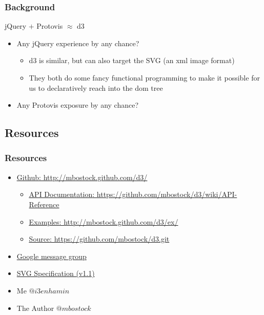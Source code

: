 \documentclass{beamer}
\begin{document}
\begin{frame}
    \frametitle{Background}
    \begin{block}{jQuery $+$ Protovis $\approx$ d3}
\pause
        \begin{itemize}
        \item Any jQuery experience by any chance?
\pause
            \begin{itemize}
            \item d3 is similar, but can also target the SVG (an xml image format)
\pause
            \item They both do some fancy functional programming to make it possible 
                  for us to declaratively reach into the dom tree
            \end{itemize}
\pause
       \item Any Protovis exposure by any chance?
       \end{itemize}
    \end{block}
\end{frame}



\subsection{Resources}

\begin{frame}
    \frametitle{Resources}
\pause
        \begin{itemize}
        \item \href{http://mbostock.github.com/d3/}{\underline{Github}: http://mbostock.github.com/d3/}
\pause
            \begin{itemize}
            \item \href{https://github.com/mbostock/d3/wiki/API-Reference}{\underline{API Documentation}: https://github.com/mbostock/d3/wiki/API-Reference}
\pause
            \item \href{http://mbostock.github.com/d3/ex/}{\underline{Examples}: http://mbostock.github.com/d3/ex/}
\pause
            \item \href{https://github.com/mbostock/d3.git}{\underline{Source}: https://github.com/mbostock/d3.git}
            \end{itemize}
\pause
        \item \href{http://groups.google.com/group/d3-js?pli=1}{Google message group}
\pause
        \item \href{http://www.w3.org/TR/SVG/}{SVG Specification (v1.1)}
\pause
        \item Me $@i3enhamin$
        \item The Author $@mbostock$
        \end{itemize}
\end{frame}
\end{document}
